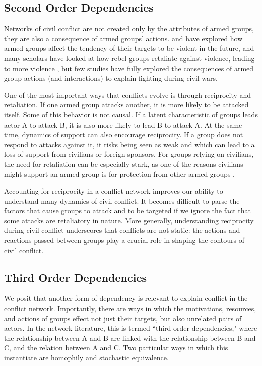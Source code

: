 \subsection{Second Order Dependencies}
Networks of civil conflict are not created only by the attributes of armed groups, they are also a consequence of armed groups' actions.  \citet{condra:shapiro:2010} and \citet{lyall:2009b} have explored how armed groups affect the tendency of their targets to be violent in the future, and many scholars have looked at how rebel groups retaliate against violence, leading to more violence \citet{kathman:wood:2015}, but few studies have fully explored the consequences of armed group actions (and interactions) to explain fighting during civil wars.

One of the most important ways that conflicts evolve is through reciprocity and retaliation. If one armed group attacks another, it is more likely to be attacked itself. Some of this behavior is not causal. If a latent characteristic of groups leads actor A to attack B, it is also more likely to lead B to attack A. At the same time, dynamics of support can also encourage reciprocity. If a group does not respond to attacks against it, it risks being seen as weak and which can lead to a loss of support from civilians or foreign sponsors. For groups relying on civilians, the need for retaliation can be especially stark, as one of the reasons civilians might support an armed group is for protection from other armed groups \citep{kalyvan:2006, valentino:etal:2004}.

Accounting for reciprocity in a conflict network improves our ability to understand many dynamics of civil conflict. It becomes difficult to parse the factors that cause groups to attack and to be targeted if we ignore the fact that some attacks are retaliatory in nature. More generally, understanding reciprocity during civil conflict underscores that conflicts are not static: the actions and reactions passed between groups play a crucial role in shaping the contours of civil conflict.

\subsection{Third Order Dependencies}
We posit that another form of dependency is relevant to explain conflict in the conflict network. Importantly, there are ways in which the motivations, resources, and actions of groups effect not just their targets, but also unrelated pairs of actors. In the network literature, this is termed ``third-order dependencies," where the relationship between A and B are linked with the relationship between B and C, and the relation between A and C. Two particular ways in which this instantiate are homophily and stochastic equivalence.


